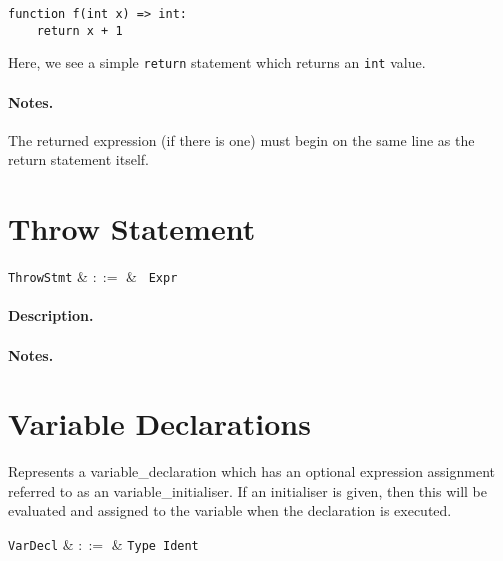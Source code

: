 \begin{lstlisting}
function f(int x) => int:
    return x + 1
\end{lstlisting}

Here, we see a simple \lstinline{return} statement which returns an \lstinline{int} value.

\paragraph{Notes.}  The returned expression (if there is one) must
begin on the same line as the return statement itself.


\section{Throw Statement}

\begin{syntax}
  \verb+ThrowStmt+ & $::=$ & \ \verb+Expr+\\
\end{syntax}

\paragraph{Description.}

\noindent

\paragraph{Notes.} 


\section{Variable Declarations}

Represents a \gls{variable_declaration} which has an optional expression assignment referred to as an \gls{variable_initialiser}.  If an initialiser is given, then this will be evaluated and assigned to the variable when the declaration is executed.

\begin{syntax}
  \verb+VarDecl+ & $::=$ & \verb+Type+\ \verb+Ident+\ \big[\
  \token{=}\ \verb+Expr+\ \big]\\
\end{syntax}

